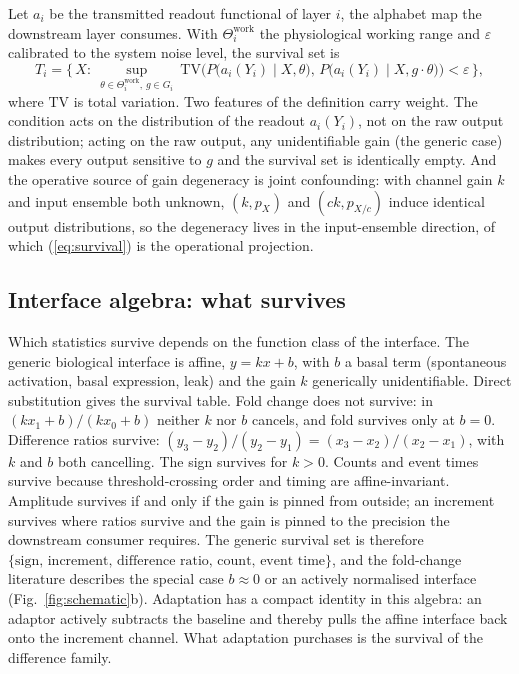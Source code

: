 \documentclass[11pt,a4paper]{article}
\begin{document}
Let $a_i$ be the transmitted readout functional of layer $i$, the alphabet map the downstream layer consumes. With $\Theta_i^{\mathrm{work}}$ the physiological working range and $\varepsilon$ calibrated to the system noise level, the survival set is
\begin{equation}
T_i=\Big\{\,X:\ \sup_{\theta\in\Theta_i^{\mathrm{work}},\,g\in G_i}\ \mathrm{TV}\Big(P\big(a_i(Y_i)\mid X,\theta\big),\,P\big(a_i(Y_i)\mid X,g\cdot\theta\big)\Big)<\varepsilon\,\Big\},
\label{eq:survival}
\end{equation}
where $\mathrm{TV}$ is total variation. Two features of the definition carry weight. The condition acts on the distribution of the readout $a_i(Y_i)$, not on the raw output distribution; acting on the raw output, any unidentifiable gain (the generic case) makes every output sensitive to $g$ and the survival set is identically empty. And the operative source of gain degeneracy is joint confounding: with channel gain $k$ and input ensemble both unknown, $(k,p_X)$ and $(ck,p_{X/c})$ induce identical output distributions, so the degeneracy lives in the input-ensemble direction, of which (\ref{eq:survival}) is the operational projection.

\subsection{Interface algebra: what survives}
\label{sec:algebra}

Which statistics survive depends on the function class of the interface. The generic biological interface is affine, $y=kx+b$, with $b$ a basal term (spontaneous activation, basal expression, leak) and the gain $k$ generically unidentifiable. Direct substitution gives the survival table. Fold change does not survive: in $(kx_1+b)/(kx_0+b)$ neither $k$ nor $b$ cancels, and fold survives only at $b=0$. Difference ratios survive: $(y_3-y_2)/(y_2-y_1)=(x_3-x_2)/(x_2-x_1)$, with $k$ and $b$ both cancelling. The sign survives for $k>0$. Counts and event times survive because threshold-crossing order and timing are affine-invariant. Amplitude survives if and only if the gain is pinned from outside; an increment survives where ratios survive and the gain is pinned to the precision the downstream consumer requires. The generic survival set is therefore $\{\text{sign, increment, difference ratio, count, event time}\}$, and the fold-change literature \cite{Goentoro2009iFFL,Shoval2010,Adler2018} describes the special case $b\approx0$ or an actively normalised interface (Fig.~\ref{fig:schematic}b). Adaptation has a compact identity in this algebra: an adaptor actively subtracts the baseline and thereby pulls the affine interface back onto the increment channel. What adaptation purchases is the survival of the difference family.
\end{document}
